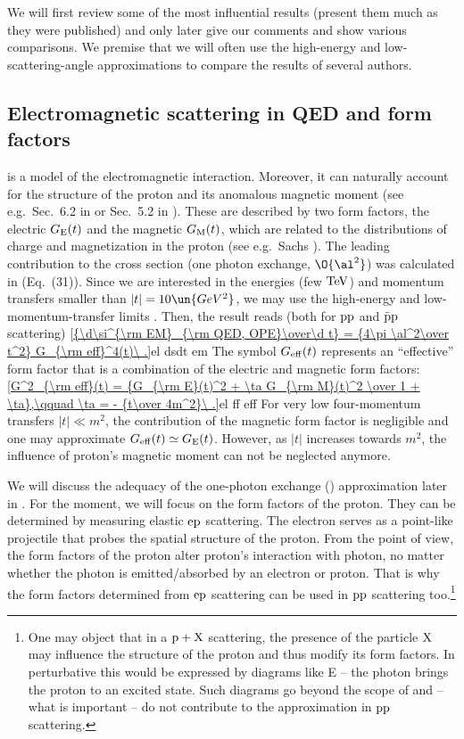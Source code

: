 We will first review some of the most influential results (present them much as they were published) and only later give our comments and show various comparisons. We premise that we will often use the high-energy and low-scattering-angle approximations to compare the results of several authors.


\subsection[em sc qed]{Electromagnetic scattering in QED and form factors}


 is a  model of the electromagnetic interaction. Moreover, it can naturally account for the structure of the proton and its anomalous magnetic moment (see e.g.~Sec.~6.2 in  or Sec.~5.2 in ). These are described by two form factors, the electric $G_{\rm E}(t)$ and the magnetic $G_{\rm M}(t)$, which are related to the distributions of charge and magnetization in the proton (see e.g.~Sachs ). The leading contribution to the cross section (one photon exchange, $\O{\al^2}$) was calculated in  (Eq.~(31)). Since we are interested in the  energies (few $\rm TeV$) and momentum transfers smaller than $|t| = 10\un{GeV^2}$, we may use the high-energy and low-momentum-transfer limits . Then, the result reads (both for $\rm pp$ and $\rm \bar p p$ scattering)
\eqref{{\d\si^{\rm EM}_{\rm QED, OPE}\over\d t} = {4\pi \al^2\over t^2} G_{\rm eff}^4(t)\ .}{el dsdt em}
The symbol $G_{\rm eff}(t)$ represents an ``effective'' form factor that is a combination of the electric and magnetic form factors:
\eqref{G^2_{\rm eff}(t) = {G_{\rm E}(t)^2 + \ta G_{\rm M}(t)^2 \over 1 + \ta},\qquad \ta = - {t\over 4m^2}\ .}{el ff eff}
For very low four-momentum transfers $|t| \ll m^2$, the contribution of the magnetic form factor is negligible and one may approximate $G_{\rm eff}(t) \simeq G_{\rm E}(t)$. However, as $|t|$ increases towards $m^2$, the influence of proton's magnetic moment can not be neglected anymore.

We will discuss the adequacy of the one-photon exchange () approximation later in . For the moment, we will focus on the form factors of the proton. They can be determined by measuring elastic $\rm ep$ scattering. The electron serves as a point-like projectile that probes the spatial structure of the proton. From the  point of view, the form factors of the proton alter proton's interaction with photon, no matter whether the photon is emitted/absorbed by an electron or proton. That is why the form factors determined from $\rm ep$ scattering can be used in $\rm pp$ scattering too.\footnote{%
One may object that in a $\rm p+X$ scattering, the presence of the particle $\rm X$ may influence the structure of the proton and thus modify its form factors. In perturbative  this would be expressed by diagrams like  E -- the photon brings the proton to an excited state. Such diagrams go beyond the scope of  and -- what is important -- do not contribute to the  approximation in $\rm pp$ scattering.
}

